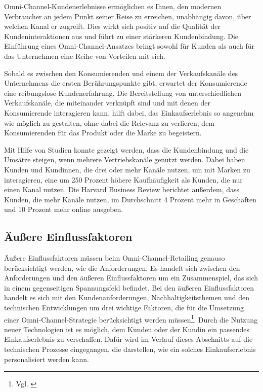 Omni-Channel-Kundenerlebnisse ermöglichen es Ihnen, den modernen Verbraucher an jedem Punkt seiner Reise zu erreichen, unabhängig davon, über welchen Kanal er zugreift. Dies wirkt sich positiv auf die Qualität der Kundeninteraktionen aus und führt zu einer stärkeren Kundenbindung. Die Einführung eines Omni-Channel-Ansatzes bringt sowohl für Kunden als auch für das Unternehmen eine Reihe von Vorteilen mit sich.
\newline

Sobald es zwischen den Konsumierenden und einem der Verkaufskanäle des Unternehmens die ersten Berührungspunkte gibt, erwartet der Konsumierende eine reibungslose Kundenerfahrung. Die Bereitstellung von unterschiedlichen Verkaufskanäle, die miteinander verknüpft sind und  mit denen der Konsumierende interagieren kann, hilft dabei, das Einkaufserlebnis so angenehm wie möglich zu gestalten, ohne dabei die Relevanz zu verlieren, dem Konsumierenden für das Produkt oder die Marke zu begeistern.
\newline

Mit Hilfe von Studien konnte gezeigt werden, dass die Kundenbindung und die Umsätze steigen, wenn mehrere Vertriebskanäle genutzt werden. Dabei haben Kunden und Kundinnen, die drei oder mehr Kanäle nutzen, um mit Marken zu interagieren, eine um 250 Prozent höhere Kaufhäufigkeit als Kunden, die nur einen Kanal nutzen. Die Harvard Business Review berichtet außerdem, dass Kunden, die mehr Kanäle nutzen, im Durchschnitt 4 Prozent mehr in Geschäften und 10 Prozent mehr online ausgeben.

\subsection{Äußere Einflussfaktoren}\label{unterabschnitt_3_4}
Äußere Einflussfaktoren müssen beim Omni-Channel-Retailing genauso berücksichtigt werden, wie die Anforderungen. Es handelt sich zwischen den Anforderungen und den äußeren Einflussfaktoren um ein Zusammenspiel, das sich in einem gegenseitigen Spannungsfeld befindet. Bei den äußeren Einflussfaktoren handelt es sich mit den Kundenanforderungen, Nachhaltigkeitsthemen und den technischen Entwicklungen um drei wichtige Faktoren, die für die Umsetzung einer Omni-Channel-Strategie berücksichtigt werden müssen\footnote{Vgl. \autocite [S. 26] {Vallee2018}}.
Durch die Nutzung neuer Technologien ist es möglich, dem Kunden oder der Kundin ein passendes Einkaufserlebnis zu verschaffen. Dafür wird im Verlauf dieses Abschnitts auf die technischen Prozesse eingegangen, die darstellen, wie ein solches Einkaufserlebnis personalisiert werden kann.

